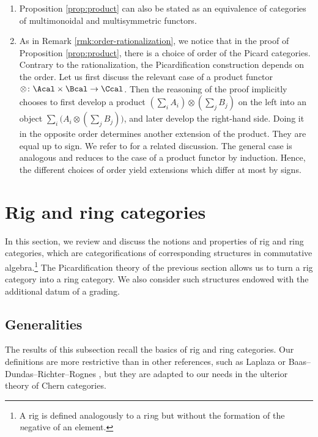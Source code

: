 \skpt
\begin{remark}\label{rem:orderdevelopproduct}
\begin{enumerate}
\item Proposition \ref{prop:product} can also be stated as an equivalence of categories of multimonoidal and multisymmetric functors.
\item\label{item:orderdevelopproduct-1} As in Remark \ref{rmk:order-rationalization}, we notice that in the proof of Proposition \ref{prop:product}, there is a choice of order of the Picard categories. Contrary to the rationalization, the Picardification construction depends on the order. Let us first discuss the relevant case of a product functor $\otimes\colon\Acal\times\Bcal\to\Ccal$. Then the reasoning of the proof implicitly chooses to first develop a product $(\sum_{i} A_i) \otimes (\sum_{j} B_j)$ on the left into an object $\sum_i \bigl(A_i \otimes(\sum_{j} B_j)\bigr)$, and later develop the right-hand side. Doing it in the opposite order determines another extension of the product. They are equal up to sign. We refer to \cite[]{Deligne-determinant} for a related discussion. The general case is analogous and reduces to the case of a product functor by induction. Hence, the different choices of order yield extensions which differ at most by signs.
\end{enumerate}
\end{remark}

\section{Rig and ring categories}\label{section:ring-categories}
In this section, we review and discuss the notions and properties of rig and ring categories, which are categorifications of corresponding structures in commutative algebra.\footnote{A rig is defined analogously to a ri\emph{n}g but without the formation of the \emph{n}egative of an element.} The Picardification theory of the previous section allows us to turn a rig category into a ring category. We also consider such structures endowed with the additional datum of a grading.

\subsection{Generalities}\label{subsec:rig-and-ring-categories}
The results of this subsection recall the basics of rig and ring categories. Our definitions are more restrictive than in other references, such as Laplaza \cite{Laplaza} or Baas--Dundas--Richter--Rognes \cite{BDRR}, but they are adapted to our needs in the ulterior theory of Chern categories.

